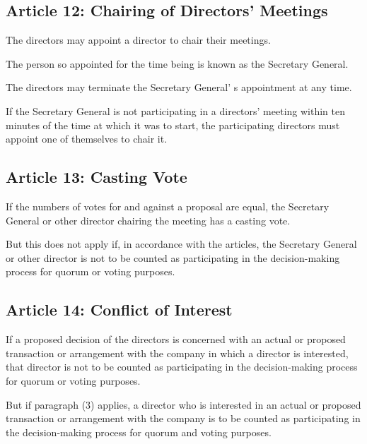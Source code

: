 \documentclass[letterpaper,10pt,openany,oneside,english]{sphinxmanual}
\begin{document}
\subsection{Article 12: Chairing of Directors’ Meetings}
\label{\detokenize{directors:article-12-chairing-of-directors-meetings}}\label{\detokenize{directors:article-12}}
 The directors may appoint a director to chair their meetings.

 The person so appointed for the time being is known as the Secretary General.

 The directors may terminate the Secretary General’ s appointment at any time.

 If the Secretary General is not participating in a directors’ meeting within ten minutes of the time at which it was to start, the participating directors must appoint one of themselves to chair it.


\subsection{Article 13: Casting Vote}
\label{\detokenize{directors:article-13-casting-vote}}\label{\detokenize{directors:article-13}}
 If the numbers of votes for and against a proposal are equal, the Secretary General or other director chairing the meeting has a casting vote.

 But this does not apply if, in accordance with the articles, the Secretary General or other director is not to be counted as participating in the decision-making process for quorum or voting purposes.


\subsection{Article 14: Conflict of Interest}
\label{\detokenize{directors:article-14-conflict-of-interest}}\label{\detokenize{directors:article-14}}
 If a proposed decision of the directors is concerned with an actual or proposed transaction or arrangement with the company in which a director is interested, that director is not to be counted as participating in the decision-making process for quorum or voting purposes.

 But if paragraph (3) applies, a director who is interested in an actual or proposed transaction or arrangement with the company is to be counted as participating in the decision-making process for quorum and voting purposes.
\end{document}
